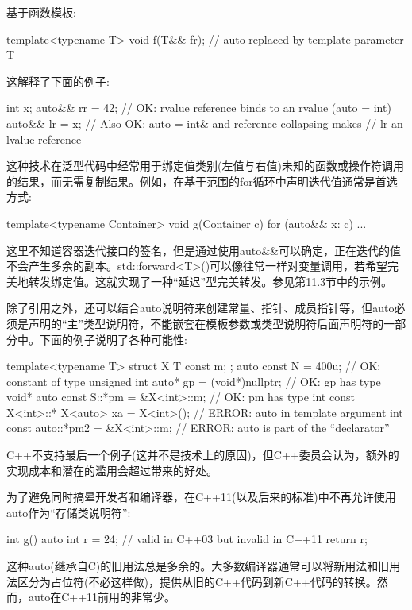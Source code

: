 基于函数模板:

\begin{cpp}
template<typename T> void f(T&& fr); // auto replaced by template parameter T
\end{cpp}

这解释了下面的例子:

\begin{cpp}
int x;
auto&& rr = 42; // OK: rvalue reference binds to an rvalue (auto = int)
auto&& lr = x; // Also OK: auto = int& and reference collapsing makes
// lr an lvalue reference
\end{cpp}

这种技术在泛型代码中经常用于绑定值类别(左值与右值)未知的函数或操作符调用的结果，而无需复制结果。例如，在基于范围的for循环中声明迭代值通常是首选方式:

\begin{cpp}
template<typename Container> void g(Container c) {
	for (auto&& x: c) {
		...
	}
}
\end{cpp}

这里不知道容器迭代接口的签名，但是通过使用auto\&\&可以确定，正在迭代的值不会产生多余的副本。std::forward<T>()可以像往常一样对变量调用，若希望完美地转发绑定值。这就实现了一种“延迟”型完美转发。参见第11.3节中的示例。

除了引用之外，还可以结合auto说明符来创建常量、指针、成员指针等，但auto必须是声明的“主”类型说明符，不能嵌套在模板参数或类型说明符后面声明符的一部分中。下面的例子说明了各种可能性:

\begin{cpp}
template<typename T> struct X { T const m; };
auto const N = 400u; // OK: constant of type unsigned int
auto* gp = (void*)nullptr; // OK: gp has type void*
auto const S::*pm = &X<int>::m; // OK: pm has type int const X<int>::*
X<auto> xa = X<int>(); // ERROR: auto in template argument
int const auto::*pm2 = &X<int>::m; // ERROR: auto is part of the “declarator”
\end{cpp}

C++不支持最后一个例子(这并不是技术上的原因)，但C++委员会认为，额外的实现成本和潜在的滥用会超过带来的好处。

为了避免同时搞晕开发者和编译器，在C++11(以及后来的标准)中不再允许使用auto作为“存储类说明符”:

\begin{cpp}
int g() {
	auto int r = 24; // valid in C++03 but invalid in C++11
	return r;
}
\end{cpp}

这种auto(继承自C)的旧用法总是多余的。大多数编译器通常可以将新用法和旧用法区分为占位符(不必这样做)，提供从旧的C++代码到新C++代码的转换。然而，auto在C++11前用的非常少。

